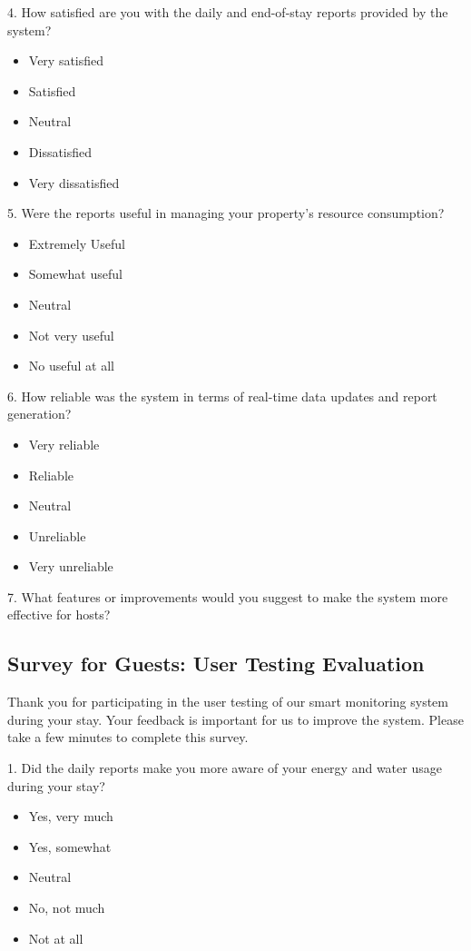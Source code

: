 4. How satisfied are you with the daily and end-of-stay reports provided by the system?
\begin{itemize}[label=\Square]
    \item Very satisfied
    \item Satisfied
    \item Neutral
    \item Dissatisfied
    \item Very dissatisfied
\end{itemize}

5. Were the reports useful in managing your property's resource consumption?
\begin{itemize}[label=\Square]
    \item Extremely Useful
    \item Somewhat useful
    \item Neutral
    \item Not very useful
    \item No useful at all
\end{itemize}

6. How reliable was the system in terms of real-time data updates and report generation?
\begin{itemize}[label=\Square]
    \item Very reliable
    \item Reliable
    \item Neutral
    \item Unreliable
    \item Very unreliable
\end{itemize}

7. What features or improvements would you suggest to make the system more effective for hosts?

\subsection{Survey for Guests: User Testing Evaluation}

Thank you for participating in the user testing of our smart monitoring system during your stay. Your feedback is 
important for us to improve the system. Please take a few minutes to complete this survey.

1. Did the daily reports make you more aware of your energy and water usage during your stay?
\begin{itemize}[label=\Square]
    \item Yes, very much
    \item Yes, somewhat
    \item Neutral
    \item No, not much  
    \item Not at all
\end{itemize}

